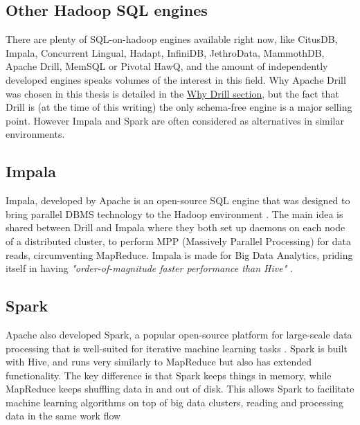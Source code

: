 \documentclass[a4paper,english]{report}
\begin{document}
		\subsection{Other Hadoop SQL engines}
		There are plenty of SQL-on-hadoop engines available right now, like CitusDB, Impala, Concurrent Lingual, Hadapt, InfiniDB, JethroData, MammothDB, Apache Drill, MemSQL or Pivotal HawQ, and the amount of independently developed engines speaks volumes of the interest in this field. Why Apache Drill was chosen in this thesis is detailed in the \hyperref[sec:why_drill]{Why Drill section}, but the fact that Drill is (at the time of this writing) the only schema-free engine is a major selling point. However Impala and Spark are often considered as alternatives in similar environments.
			\subsection{Impala}
			Impala, developed by Apache is an open-source SQL engine that was designed to bring parallel DBMS technology to the Hadoop environment \cite{impala}. The main idea is shared between Drill and Impala where they both set up daemons on each node of a distributed cluster, to perform MPP (Massively Parallel Processing) for data reads, circumventing MapReduce. Impala is made for Big Data Analytics, priding itself in having \textit{"order-of-magnitude faster performance than Hive"} \cite{impalasite}.
			\subsection{Spark}
			Apache also developed Spark, a popular open-source platform for large-scale data processing that is	well-suited for iterative machine learning tasks \cite{spark_ml}. Spark is built with Hive, and runs very similarly to MapReduce but also has extended functionality. The key difference is that Spark keeps things in memory, while MapReduce keeps shuffling data in and out of disk. This allows Spark to facilitate machine learning algorithms on top of big data clusters, reading and processing data in the same work flow
			
\end{document}
